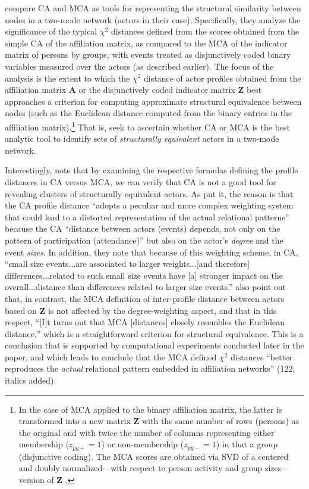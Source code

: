 \documentclass[a4paper,fleqn]{cas-sc}
\begin{document}
\citet{desposito2014comparison} compare CA and MCA as tools for representing the structural similarity between nodes in a two-mode network (actors in their case). Specifically, they analyze the significance of the typical $\chi^2$ distances defined from the scores obtained from the simple CA of the affiliation matrix, as compared to the MCA of the indicator matrix of persons by groups, with events treated as disjunctively coded binary variables measured over the actors (as described earlier). The focus of the analysis is the extent to which the $\chi^2$ distance of actor profiles obtained from the affiliation matrix $\mathbf{A}$ or the disjunctively coded indicator matrix $\mathbf{Z}$ best approaches a criterion for computing approximate structural equivalence between nodes (such as the Euclidean distance computed from the binary entries in the affiliation matrix).\footnote{In the case of MCA applied to the binary affiliation matrix, the latter is transformed into a new matrix $\mathbf{Z}$ with the same number of rows (persons) as the original and with twice the number of columns representing either membership ($z_{pg+} = 1$) or non-membership ($z_{pg-} = 1$) in that a group (disjunctive coding). The MCA scores are obtained via SVD of a centered and doubly normalized---with respect to person activity and group sizes---version of $\mathbf{Z}$ \citep{desposito2014use}.}  That is, \citet{desposito2014comparison} seek to ascertain whether CA or MCA is the best analytic tool to identify sets of \textit{structurally equivalent} actors in a two-mode network. 

Interestingly, \citet[115]{desposito2014comparison} note that by examining the respective formulas defining the profile distances in CA versus MCA, we can verify that CA is not a good tool for revealing clusters of structurally equivalent actors. As \citet{desposito2014comparison} put it, the reason is that the CA profile distance ``adopts a peculiar and more complex weighting system that could lead to a distorted representation of the actual relational patterns'' because the CA ``distance between actors (events) depends, not only on the pattern of participation (attendance)'' but also on the actor's \textit{degree} and the event \textit{sizes}. In addition, they note that because of this weighting scheme, in CA, ``small size events...are associated to larger weights...[and therefore] differences...related to such small size events have [a] stronger impact on the overall...distance than differences related to larger size events.'' \citet{desposito2014comparison} also point out that, in contrast, the MCA definition of inter-profile distance between actors based on $\mathbf{Z}$ is not affected by the degree-weighting aspect, and that in this respect, ``[I]t turns out that MCA [distances] closely resembles the Euclidean distance,'' which is a straightforward criterion for structural equivalence. This is a conclusion that is supported by computational experiments conducted later in the paper, and which leads \citet{desposito2014comparison} to conclude that the MCA defined  $\chi^2$ distances ``better reproduces the \textit{actual} relational pattern embedded in affiliation networks'' (122, italics added).
\end{document}
